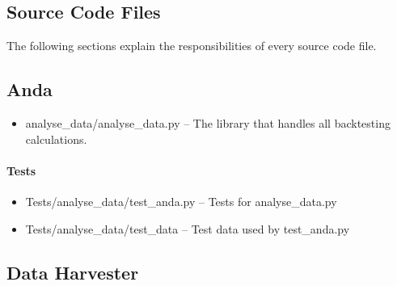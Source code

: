 \documentclass[main.tex]{subfiles}
\begin{document}
\subsection{Source Code Files}
\label{source-code-files}

The following sections explain the responsibilities of every source code file. 

\subsection{Anda}
\label{anda}

\begin{itemize}
\item
  analyse\_data/analyse\_data.py -- The library that handles all backtesting calculations.
\end{itemize}

\paragraph{Tests}\label{tests}

\begin{itemize}

\item
  Tests/analyse\_data/test\_anda.py -- Tests for analyse\_data.py
\item
  Tests/analyse\_data/test\_data -- Test data used by test\_anda.py
\end{itemize}

\subsection{Data Harvester}
\label{data-harvester}
\end{document}
